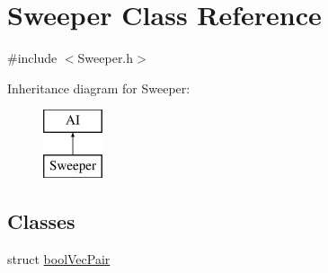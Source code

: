 \hypertarget{class_sweeper}{}\section{Sweeper Class Reference}
\label{class_sweeper}


{\ttfamily \#include $<$Sweeper.\+h$>$}

Inheritance diagram for Sweeper\+:\begin{figure}[H]
\begin{center}
\leavevmode
\includegraphics[height=2.000000cm]{class_sweeper}
\end{center}
\end{figure}
\subsection*{Classes}
\begin{DoxyCompactItemize}
\item 
struct \mbox{\hyperlink{struct_sweeper_1_1bool_vec_pair}{bool\+Vec\+Pair}}
\end{DoxyCompactItemize}
